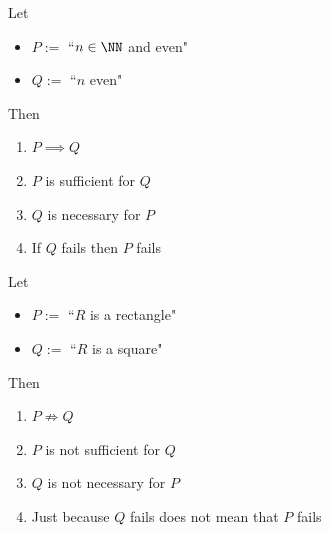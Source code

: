 \begin{frame}
    
    \begin{example}

        Let 
        \begin{itemize}
            \item $P := $ ``$n \in \NN$ and even"
            \item $Q := $ ``$n$ even"
        \end{itemize}
        

        Then 
        \begin{enumerate}
            \item $P \implies Q$
            \item $P$ is sufficient for $Q$
            \item $Q$ is necessary for $P$ 
            \item If $Q$ fails then $P$ fails
        \end{enumerate}

    \end{example}


\end{frame}


\begin{frame}
    
    \begin{example}

        Let 
        \begin{itemize}
            \item $P := $ ``$R$ is a rectangle"
            \item $Q := $ ``$R$ is a square"
        \end{itemize}
        

        Then 
        \begin{enumerate}
            \item $P \not \Rightarrow Q$
            \item $P$ is not sufficient for $Q$
            \item $Q$ is not necessary for $P$ 
            \item Just because $Q$ fails does not mean that $P$ fails
        \end{enumerate}

    \end{example}

\end{frame}


